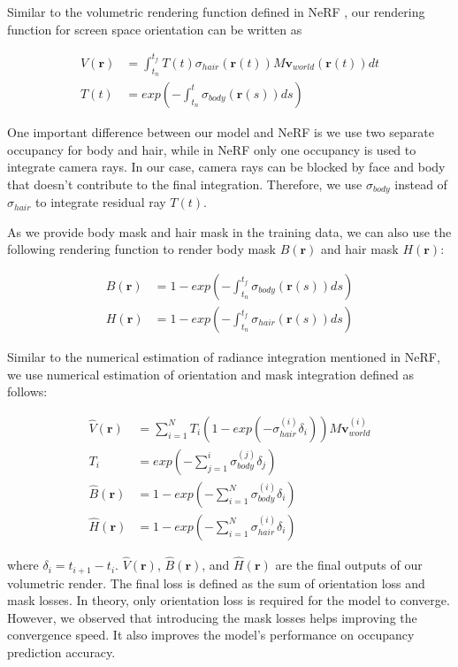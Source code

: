 \documentclass[12pt]{article}
\begin{document}
Similar to the volumetric rendering function defined in NeRF \cite{mildenhall_nerf_2020}, our rendering function for screen space orientation can be written as

\begin{align}
	V(\mathbf{r}) & = \int_{t_{n}}^{t_{f}} T(t) \sigma_{hair}(\mathbf{r}(t)) M \mathbf{v}_{world}(\mathbf{r}(t)) dt \\
	T(t) & = exp(-\int_{t_{n}}^{t} \sigma_{body}(\mathbf{r}(s)) ds)
\end{align}

One important difference between our model and NeRF is we use two separate occupancy for body and hair, while in NeRF only one occupancy is used to integrate camera rays. In our case, camera rays can be blocked by face and body that doesn't contribute to the final integration. Therefore, we use $\sigma_{body}$ instead of $\sigma_{hair}$ to integrate residual ray $T(t)$.

As we provide body mask and hair mask in the training data, we can also use the following rendering function to render body mask $B(\mathbf{r})$ and hair mask $H(\mathbf{r})$:

\begin{align}
	B(\mathbf{r}) & = 1 - exp(-\int_{t_{n}}^{t_{f}} \sigma_{body}(\mathbf{r}(s)) ds) \\
	H(\mathbf{r}) & = 1 - exp(-\int_{t_{n}}^{t_{f}} \sigma_{hair}(\mathbf{r}(s)) ds)
\end{align}

Similar to the numerical estimation of radiance integration mentioned in NeRF, we use numerical estimation of orientation and mask integration defined as follows:

\begin{align}
	\hat{V}(\mathbf{r}) & = \sum_{i=1}^{N} T_{i} (1 - exp(-\sigma_{hair}^{(i)} \delta_{i})) M \mathbf{v}_{world}^{(i)} \\
	T_{i} & = exp(-\sum_{j=1}^{i} \sigma_{body}^{(j)} \delta_{j}) \\
	\hat{B}(\mathbf{r}) & = 1 - exp(-\sum_{i=1}^{N} \sigma_{body}^{(i)} \delta_{i}) \\
	\hat{H}(\mathbf{r}) & = 1 - exp(-\sum_{i=1}^{N} \sigma_{hair}^{(i)} \delta_{i})
\end{align}

where $\delta_{i} = t_{i + 1} - t_{i}$. $\hat{V}(\mathbf{r})$, $\hat{B}(\mathbf{r})$, and $\hat{H}(\mathbf{r})$ are the final outputs of our volumetric render. The final loss is defined as the sum of orientation loss and mask losses. In theory, only orientation loss is required for the model to converge. However, we observed that introducing the mask losses helps improving the convergence speed. It also improves the model's performance on occupancy prediction accuracy.
\end{document}
